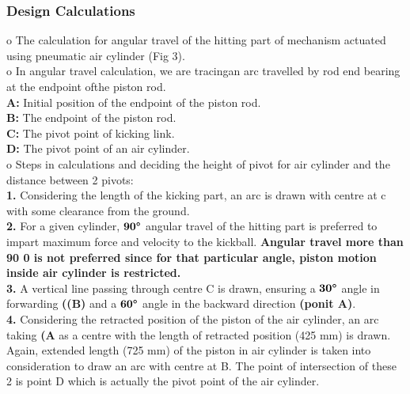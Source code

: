         \subsubsection{Design Calculations}
            o The calculation for angular travel of the hitting part of mechanism actuated using pneumatic air cylinder (Fig 3).                    \\
            o In angular travel calculation, we are tracingan arc travelled by rod end bearing at the endpoint ofthe piston rod.                    \\
                \textbf{A:} Initial position of the endpoint of the piston rod.                                                                     \\
                \textbf{B:} The endpoint of the piston rod.                                                                                         \\
                \textbf{C:} The pivot point of kicking link.                                                                                        \\
                \textbf{D:} The pivot point of an air cylinder.                                                                                     \\
            o Steps in calculations and deciding the height of pivot for air cylinder and the distance between 2 pivots:                            \\
                \textbf{1.} Considering the length of the kicking part, an arc is drawn with centre at c with some clearance from the ground.       \\
                \textbf{2.} For a given cylinder, $\textbf{90\degree}$ angular travel of the hitting part is preferred to impart maximum force and velocity 
                            to the kickball. \textbf{Angular travel more than 90 0 is not preferred since for that particular angle, piston 
                            motion inside air cylinder is restricted.}                                                                                  \\
                \textbf{3.} A vertical line passing through centre C is drawn, ensuring a $\textbf{30\degree}$ angle in forwarding \textbf{((B)} and
                            a $\textbf{60\degree}$ angle in the backward direction \textbf{(ponit A)}.                                                  \\    
                \textbf{4.} Considering the retracted position of the piston of the air cylinder, an arc taking \textbf{(A} as a centre with
                            the length of retracted position (425 mm) is drawn. Again, extended length (725 mm) of the piston in air cylinder
                            is taken into consideration to draw an arc with centre at B. The point of intersection of these 2 is point D which
                            is actually the pivot point of the air cylinder.                                                                            \\
    
